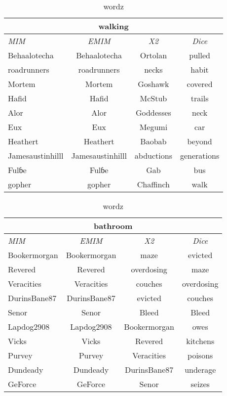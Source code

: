 \begin{table}[h!]
\centering
\begin{tabular}{ l | c | c | c }
\hline
\multicolumn{4}{c}{walking}\\
\hline
\textit{MIM} & \textit{EMIM} & \textit{X2} & \textit{Dice}\\
\hline
Behaalotecha & Behaalotecha & Ortolan & pulled\\
roadrunners & roadrunners & necks & habit\\
Mortem & Mortem & Goshawk & covered\\
Hafid & Hafid & McStub & trails\\
Alor & Alor & Goddesses & neck\\
Eux & Eux & Megumi & car\\
Heathert & Heathert & Baobab & beyond\\
Jamesaustinhilll & Jamesaustinhilll & abductions & generations\\
Fulɓe & Fulɓe & Gab & bus\\
gopher & gopher & Chaffinch & walk\\
\hline
\end{tabular}
\caption{wordz}
\label{tab:words}
\end{table}
\begin{table}[h!]
\centering
\begin{tabular}{ l | c | c | c }
\hline
\multicolumn{4}{c}{bathroom}\\
\hline
\textit{MIM} & \textit{EMIM} & \textit{X2} & \textit{Dice}\\
\hline
Bookermorgan & Bookermorgan & maze & evicted\\
Revered & Revered & overdosing & maze\\
Veracities & Veracities & couches & overdosing\\
DurinsBane87 & DurinsBane87 & evicted & couches\\
Senor & Senor & Bleed & Bleed\\
Lapdog2908 & Lapdog2908 & Bookermorgan & owes\\
Vicks & Vicks & Revered & kitchens\\
Purvey & Purvey & Veracities & poisons\\
Dundeady & Dundeady & DurinsBane87 & underage\\
GeForce & GeForce & Senor & seizes\\
\hline
\end{tabular}
\caption{wordz}
\label{tab:words}
\end{table}

